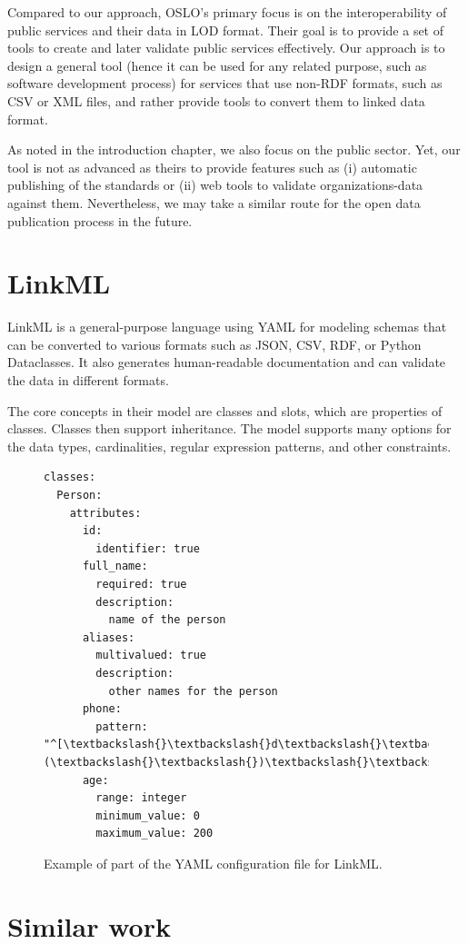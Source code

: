 \medskip

Compared to our approach, OSLO's primary focus is on the interoperability of public services and their data in LOD format. Their goal is to provide a set of tools to create and later validate public services effectively. Our approach is to design a general tool (hence it can be used for any related purpose, such as software development process) for services that use non-RDF formats, such as CSV or XML files, and rather provide tools to convert them to linked data format.

As noted in the introduction chapter, we also focus on the public sector. Yet, our tool is not as advanced as theirs to provide features such as (i) automatic publishing of the standards or (ii) web tools to validate organizations-data against them. Nevertheless, we may take a similar route for the open data publication process in the future.

\section{LinkML}

LinkML is a general-purpose language using YAML for modeling schemas that can be converted to various formats such as JSON, CSV, RDF, or Python Dataclasses. It also generates human-readable documentation and can validate the data in different formats.

The core concepts in their model are classes and slots, which are properties of classes. Classes then support inheritance. The model supports many options for the data types, cardinalities, regular expression patterns, and other constraints.


\begin{figure}[h!]\centering
    \begin{Verbatim}[commandchars=\\\{\}]
classes:
  Person:
    attributes:
      id:
        identifier: true
      full_name:
        required: true
        description:
          name of the person
      aliases:
        multivalued: true
        description:
          other names for the person
      phone:
        pattern: "^[\textbackslash{}\textbackslash{}d\textbackslash{}\textbackslash{}(\textbackslash{}\textbackslash{})\textbackslash{}\textbackslash{}-]+$"
      age:
        range: integer
        minimum_value: 0
        maximum_value: 200
    \end{Verbatim}
    \caption{Example of part of the YAML configuration file for LinkML.}
\end{figure}


\section{Similar work}

